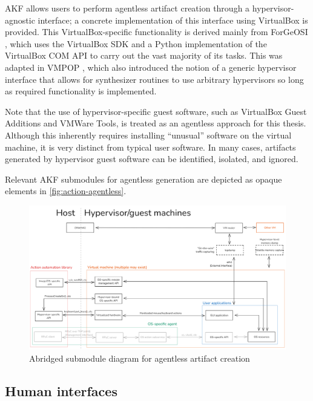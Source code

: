 \documentclass[letterpaper,12pt]{report}
\begin{document}
AKF allows users to perform agentless artifact creation through a
hypervisor-agnostic interface; a concrete implementation of this
interface using VirtualBox is provided. This VirtualBox-specific
functionality is derived mainly from ForGeOSI
\cite{maxfraggMaxfraggForGeOSI2023}, which uses the VirtualBox SDK
and a Python implementation of the VirtualBox COM API
\cite{larsonSethmlarsonVirtualboxpython2025} to carry out the vast
majority of its tasks. This was adapted in VMPOP
\cite{parkTREDEVMPOPCultivating2018}, which also introduced the
notion of a generic hypervisor interface that allows for synthesizer
routines to use arbitrary hypervisors so long as required functionality
is implemented.

Note that the use of hypervisor-specific guest software, such as
VirtualBox Guest Additions and VMWare Tools, is treated as an agentless
approach for this thesis. Although this inherently requires installing
``unusual'' software on the virtual machine, it is very distinct from
typical user software. In many cases, artifacts generated by hypervisor
guest software can be identified, isolated, and ignored.

Relevant AKF submodules for agentless generation are depicted as opaque
elements in \autoref{fig:action-agentless}.

\begin{figure}[h]
\centering
\includegraphics[width=1\linewidth]{action-agentless.png}
\caption{Abridged submodule diagram for agentless artifact
creation}\label{fig:action-agentless}
\end{figure}

\subsection{Human interfaces}\label{human-interfaces}
\end{document}
